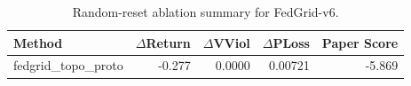\begin{table}[t]
\centering
\small
\begin{tabular}{lrrrr}
\hline
Method & $\Delta$Return & $\Delta$VViol & $\Delta$PLoss & Paper Score \\
\hline
[case=141, k=6, policy=, radius=] fedgrid\_topo\_proto & -0.277 & 0.0000 & 0.00721 & -5.869 \\
\hline
\end{tabular}
\caption{Random-reset ablation summary for FedGrid-v6.}
\label{tab:fedgrid-ablation-random-reset}
\end{table}

